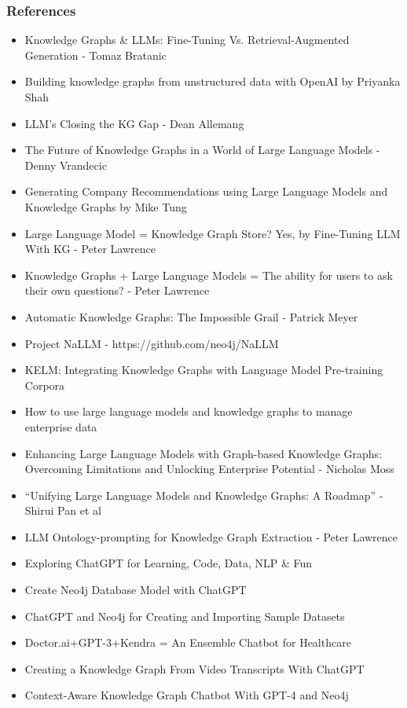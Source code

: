 \begin{frame}[fragile]\frametitle{References}
{\tiny 
\begin{itemize}
\item Knowledge Graphs \& LLMs: Fine-Tuning Vs. Retrieval-Augmented Generation - Tomaz Bratanic
\item Building knowledge graphs from unstructured data with OpenAI by Priyanka Shah
\item LLM’s Closing the KG Gap - Dean Allemang
\item The Future of Knowledge Graphs in a World of Large Language Models - Denny Vrandecic
\item Generating Company Recommendations using Large Language Models and Knowledge Graphs by Mike Tung
\item Large Language Model = Knowledge Graph Store? Yes, by Fine-Tuning LLM With KG - Peter Lawrence
\item Knowledge Graphs + Large Language Models = The ability for users to ask their own questions? - Peter Lawrence
\item Automatic Knowledge Graphs: The Impossible Grail - Patrick Meyer
\item Project NaLLM - https://github.com/neo4j/NaLLM
\item KELM: Integrating Knowledge Graphs with Language Model Pre-training Corpora 
\item How to use large language models and knowledge graphs to manage enterprise data 
\item Enhancing Large Language Models with Graph-based Knowledge Graphs: Overcoming Limitations and Unlocking Enterprise Potential - Nicholas Moss
\item ``Unifying Large Language Models and Knowledge Graphs: A Roadmap'' - Shirui Pan et al
\item LLM Ontology-prompting for Knowledge Graph Extraction - Peter Lawrence
\item Exploring ChatGPT for Learning, Code, Data, NLP \& Fun
\item Create Neo4j Database Model with ChatGPT
\item ChatGPT and Neo4j for Creating and Importing Sample Datasets
\item Doctor.ai+GPT-3+Kendra = An Ensemble Chatbot for Healthcare
\item Creating a Knowledge Graph From Video Transcripts With ChatGPT
\item Context-Aware Knowledge Graph Chatbot With GPT-4 and Neo4j
\end{itemize}
}
\end{frame}

